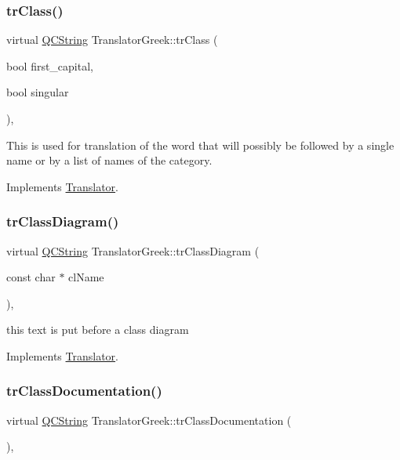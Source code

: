 \subsubsection{\texorpdfstring{trClass()}{trClass()}}
{\footnotesize\ttfamily virtual \mbox{\hyperlink{class_q_c_string}{Q\+C\+String}} Translator\+Greek\+::tr\+Class (\begin{DoxyParamCaption}\item[{bool}]{first\+\_\+capital,  }\item[{bool}]{singular }\end{DoxyParamCaption})\hspace{0.3cm}{\ttfamily [inline]}, {\ttfamily [virtual]}}

This is used for translation of the word that will possibly be followed by a single name or by a list of names of the category. 

Implements \mbox{\hyperlink{class_translator}{Translator}}.

\mbox{\label{class_translator_greek_ae5c29b786795e7d1f8f6dea40e618539}} 
\subsubsection{\texorpdfstring{trClassDiagram()}{trClassDiagram()}}
{\footnotesize\ttfamily virtual \mbox{\hyperlink{class_q_c_string}{Q\+C\+String}} Translator\+Greek\+::tr\+Class\+Diagram (\begin{DoxyParamCaption}\item[{const char $\ast$}]{cl\+Name }\end{DoxyParamCaption})\hspace{0.3cm}{\ttfamily [inline]}, {\ttfamily [virtual]}}

this text is put before a class diagram 

Implements \mbox{\hyperlink{class_translator}{Translator}}.

\mbox{\label{class_translator_greek_a278d73aa90131d7ac5f893085f9bd44e}} 
\subsubsection{\texorpdfstring{trClassDocumentation()}{trClassDocumentation()}}
{\footnotesize\ttfamily virtual \mbox{\hyperlink{class_q_c_string}{Q\+C\+String}} Translator\+Greek\+::tr\+Class\+Documentation (\begin{DoxyParamCaption}{ }\end{DoxyParamCaption})\hspace{0.3cm}{\ttfamily [inline]}, {\ttfamily [virtual]}}

